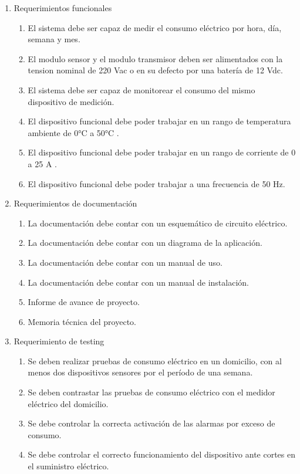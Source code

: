 \documentclass[
11pt, %
]{charter}
\begin{document}
\begin{enumerate}
	\item Requerimientos funcionales
		\begin{enumerate}
			\item El sistema debe ser capaz de medir el consumo eléctrico por hora, día, semana y mes.
			\item El modulo sensor y el modulo transmisor deben ser alimentados con la tension nominal de 220 Vac o en su defecto por una batería de 12 Vdc.
			\item El sistema debe ser capaz de monitorear el consumo del mismo dispositivo de medición.
			\item El dispositivo funcional debe poder trabajar en un rango de temperatura ambiente de 0°C a 50°C .
			\item El dispositivo funcional debe poder trabajar en un rango de corriente de 0 a 25 A .
			\item El dispositivo funcional debe poder trabajar a una frecuencia de 50 Hz.
			
		\end{enumerate}
		
	\item Requerimientos de documentación
		\begin{enumerate}
			\item La documentación debe contar con un esquemático de circuito eléctrico.
			\item La documentación debe contar con  un diagrama de la aplicación.
			\item La documentación debe contar con un manual de uso.
			\item La documentación debe contar con un manual de instalación.
			\item Informe de avance de proyecto.
			\item Memoria técnica del proyecto.
		\end{enumerate}
		
	\item Requerimiento de testing
		\begin{enumerate}
			\item Se deben realizar pruebas de consumo eléctrico en un domicilio, con al menos dos dispositivos sensores por el período de una semana.
			\item Se deben contrastar las pruebas de consumo eléctrico con el medidor eléctrico del domicilio.
			\item Se debe controlar la correcta activación de las alarmas por exceso de consumo.
			\item Se debe controlar el correcto funcionamiento del dispositivo ante cortes en el suministro eléctrico.
								

\end{enumerate}
\end{enumerate}
\end{document}
